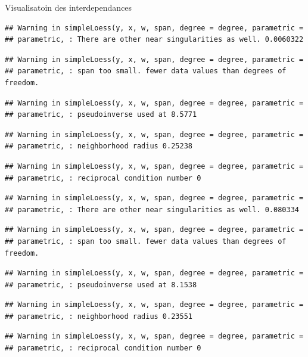 \documentclass[11pt,ignorenonframetext,]{beamer}
\begin{document}
\begin{frame}[fragile]{Visualisatoin des interdependances}
\begin{verbatim}
## Warning in simpleLoess(y, x, w, span, degree = degree, parametric =
## parametric, : There are other near singularities as well. 0.0060322
\end{verbatim}

\begin{verbatim}
## Warning in simpleLoess(y, x, w, span, degree = degree, parametric =
## parametric, : span too small. fewer data values than degrees of freedom.
\end{verbatim}

\begin{verbatim}
## Warning in simpleLoess(y, x, w, span, degree = degree, parametric =
## parametric, : pseudoinverse used at 8.5771
\end{verbatim}

\begin{verbatim}
## Warning in simpleLoess(y, x, w, span, degree = degree, parametric =
## parametric, : neighborhood radius 0.25238
\end{verbatim}

\begin{verbatim}
## Warning in simpleLoess(y, x, w, span, degree = degree, parametric =
## parametric, : reciprocal condition number 0
\end{verbatim}

\begin{verbatim}
## Warning in simpleLoess(y, x, w, span, degree = degree, parametric =
## parametric, : There are other near singularities as well. 0.080334
\end{verbatim}

\begin{verbatim}
## Warning in simpleLoess(y, x, w, span, degree = degree, parametric =
## parametric, : span too small. fewer data values than degrees of freedom.
\end{verbatim}

\begin{verbatim}
## Warning in simpleLoess(y, x, w, span, degree = degree, parametric =
## parametric, : pseudoinverse used at 8.1538
\end{verbatim}

\begin{verbatim}
## Warning in simpleLoess(y, x, w, span, degree = degree, parametric =
## parametric, : neighborhood radius 0.23551
\end{verbatim}

\begin{verbatim}
## Warning in simpleLoess(y, x, w, span, degree = degree, parametric =
## parametric, : reciprocal condition number 0
\end{verbatim}


\end{frame}
\end{document}
